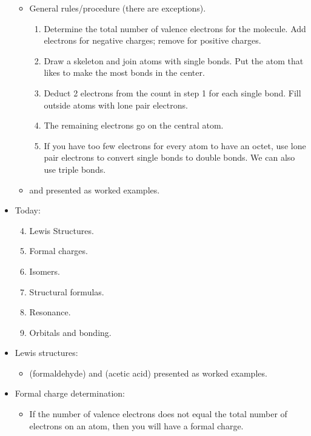 \documentclass[../notes.tex]{subfiles}
\begin{document}
\begin{itemize}
    \begin{itemize}
        \item General rules/procedure (there are exceptions).
        \begin{enumerate}
            \item Determine the total number of valence electrons for the molecule. Add electrons for negative charges; remove for positive charges.
            \item Draw a skeleton and join atoms with single bonds. Put the atom that likes to make the most bonds in the center.
            \item Deduct 2 electrons from the count in step 1 for each single bond. Fill outside atoms with lone pair electrons.
            \item The remaining electrons go on the central atom.
            \item If you have too few electrons for every atom to have an octet, use lone pair electrons to convert single bonds to double bonds. We can also use triple bonds.
        \end{enumerate}
        \item {} and  presented as worked examples.
    \end{itemize}
    \item {}Today:
    \begin{enumerate}
        \setcounter{enumi}{3}
        \item Lewis Structures.
        \item Formal charges.
        \item Isomers.
        \item Structural formulas.
        \item Resonance.
        \item Orbitals and bonding.
    \end{enumerate}
    \item Lewis structures:
    \begin{itemize}
        \item {} (formaldehyde) and  (acetic acid) presented as worked examples.
    \end{itemize}
    \item Formal charge determination:
    \begin{itemize}
        \item If the number of valence electrons does not equal the total number of electrons on an atom, then you will have a formal charge.

\end{itemize}
\end{itemize}
\end{document}
